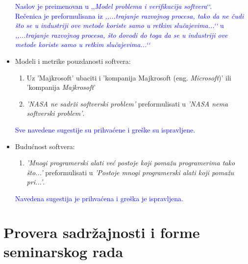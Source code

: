 \documentclass[a4paper]{report}
\newcommand{\odgovor}[1]{\textcolor{blue}{#1}}
\begin{document}
\begin{itemize}
\odgovor{
Naslov je preimenovan u ,,\textit{Model problema i verifikacija softvera}‘‘. \\
Rečenica je preformulisana iz \textit{,,...trajanje razvojnog procesa, tako da ne čudi što se u industriji ove metode koriste samo u retkim slučajevima...‘‘} u \textit{,,...trajanje razvojnog procesa, što dovodi do toga da se u industriji ove metode koriste samo u retkim slučajevima...‘‘}
}    
    
    \item Modeli i metrike pouzdanosti softvera:
    \begin{enumerate}
        \item Uz 'Majkrosoft' ubaciti i 'kompanija Majkrosoft (eng. \textit{Microsoft})' ili 'kompanija \textit{Majkrosoft}'
        \item \textit{'NASA ne sadrži softverski problem'} preformulisati u \textit{'NASA nema softverski problem'}.
    \end{enumerate}

\odgovor{
Sve navedene sugestije su prihvaćene i greške su ispravljene.
}	    
    
    \item Budućnost softvera:
    \begin{enumerate}
        \item \textit{'Mnogi programerski alati već postoje koji pomažu programerima tako što...'} preformulisati u \textit{'Postoje mnogi programerski alati koji pomažu pri...'}.
    \end{enumerate}

\odgovor{
Navedena sugestija je prihvaćena i greška je ispravljena.
}    
    
\end{itemize}


\section{Provera sadržajnosti i forme seminarskog rada}
\end{document}
